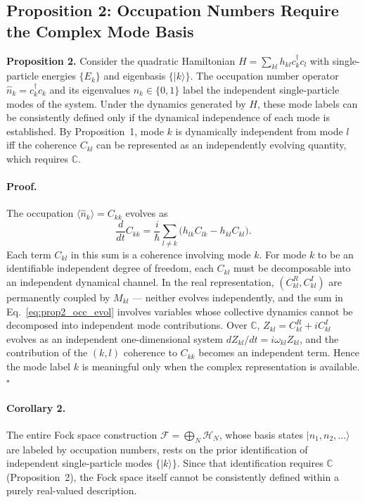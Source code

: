 \documentclass[aps,pra,preprint,groupedaddress,amsmath,amssymb,floatfix]{revtex4-2}
\begin{document}
\subsection{Proposition 2: Occupation Numbers Require the Complex Mode Basis}
\label{sec:th1_prop2}

\textbf{Proposition 2.} Consider the quadratic Hamiltonian $H = \sum_{kl} h_{kl} c^\dagger_k c_l$ with single-particle energies $\{E_k\}$ and eigenbasis $\{|k\rangle\}$. The occupation number operator $\hat{n}_k = c^\dagger_k c_k$ and its eigenvalues $n_k \in \{0,1\}$ label the independent single-particle modes of the system. Under the dynamics generated by $H$, these mode labels can be consistently defined only if the dynamical independence of each mode is established. By Proposition~1, mode $k$ is dynamically independent from mode $l$ iff the coherence $C_{kl}$ can be represented as an independently evolving quantity, which requires $\mathbb{C}$.

\paragraph{Proof.} The occupation $\langle \hat{n}_k \rangle = C_{kk}$ evolves as
\begin{equation}
\frac{d}{dt} C_{kk} = \frac{i}{\hbar}\sum_{l \neq k} \bigl( h_{lk} C_{lk} - h_{kl} C_{kl} \bigr).
\label{eq:prop2_occ_evol}
\end{equation}
Each term $C_{kl}$ in this sum is a coherence involving mode $k$. For mode $k$ to be an identifiable independent degree of freedom, each $C_{kl}$ must be decomposable into an independent dynamical channel. In the real representation, $(C^R_{kl}, C^I_{kl})$ are permanently coupled by $M_{kl}$ --- neither evolves independently, and the sum in Eq.~\eqref{eq:prop2_occ_evol} involves variables whose collective dynamics cannot be decomposed into independent mode contributions. Over $\mathbb{C}$, $Z_{kl} = C^R_{kl} + i C^I_{kl}$ evolves as an independent one-dimensional system $dZ_{kl}/dt = i\omega_{kl} Z_{kl}$, and the contribution of the $(k,l)$ coherence to $C_{kk}$ becomes an independent term. Hence the mode label $k$ is meaningful only when the complex representation is available. $\square$

\paragraph{Corollary 2.} The entire Fock space construction $\mathcal{F} = \bigoplus_N \mathcal{H}_N$, whose basis states $|n_1, n_2, \ldots\rangle$ are labeled by occupation numbers, rests on the prior identification of independent single-particle modes $\{|k\rangle\}$. Since that identification requires $\mathbb{C}$ (Proposition~2), the Fock space itself cannot be consistently defined within a purely real-valued description.
\end{document}
